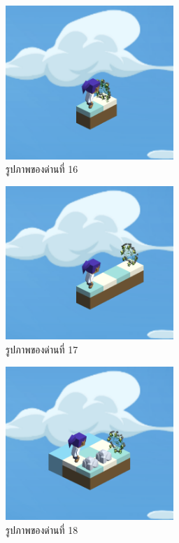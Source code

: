 \begin{figure}[H]
    \begin{center}
    \includegraphics[width=2.5in]{pic-toro/stage/s16.png}
    \end{center}
    \caption[รูปภาพของด่านที่ 16]{รูปภาพของด่านที่ 16}
    \label{s16}
\end{figure}
\begin{figure}[H]
    \begin{center}
    \includegraphics[width=2.5in]{pic-toro/stage/s17.png}
    \end{center}
    \caption[รูปภาพของด่านที่ 17]{รูปภาพของด่านที่ 17}
    \label{s17}
\end{figure}
\begin{figure}[H]
    \begin{center}
    \includegraphics[width=2.5in]{pic-toro/stage/s18.png}
    \end{center}
    \caption[รูปภาพของด่านที่ 18]{รูปภาพของด่านที่ 18}
    \label{s18}
\end{figure}
